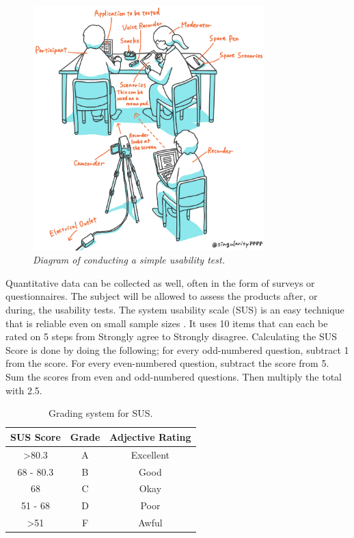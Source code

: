 \begin{figure}[ht]
	\centering 
    \includegraphics[width=0.8\textwidth]{img/usability_test_example.png}
	\hfill
	\caption{\textit{Diagram of conducting a simple usability test. \cite{Shingyouchi2019} }}
\end{figure}

Quantitative data can be collected as well, often in the form of surveys or questionnaires. The subject will be allowed to assess the products after, or during, the usability tests. 
The system usability scale (SUS) is an easy technique that is reliable even on small sample sizes \cite{SUSUsability}. It uses 10 items that can each be rated on 5 steps from Strongly agree to Strongly disagree. 
Calculating the SUS Score is done by doing the following; for every odd-numbered question, subtract 1 from the score. For every even-numbered question, subtract the score from 5. Sum the scores from even and odd-numbered questions. Then multiply the total with 2.5.
\newline

\begin{table}[ht]
    \centering
    \begin{tabular}{ |c|c|c| } 
        \hline
        \rowcolor{light-gray}
        SUS Score & Grade & Adjective Rating\\
        \hline
        >80.3 & A & Excellent \\ 
        \hline
        68 - 80.3 & B & Good \\ 
        \hline
        68 & C & Okay \\ 
        \hline
        51 - 68 & D & Poor \\
        \hline
        >51 & F & Awful \\
        \hline
    \end{tabular}
    \caption{\label{tab:sus-grading}Grading system for SUS.}
\end{table}

